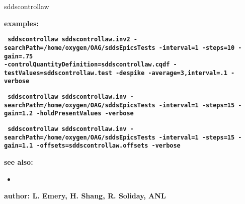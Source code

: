 \begin{sddsprog}{sddscontrollaw}
\item {\bf examples:}
     \begin{flushleft}{\tt \bf
        sddscontrollaw sddscontrollaw.inv2 -searchPath=/home/oxygen/OAG/sddsEpicsTests -interval=1 -steps=10 -gain=.75 \\
         -controlQuantityDefinition=sddscontrollaw.cqdf -testValues=sddscontrollaw.test -despike -average=3,interval=.1 -verbose
     }\end{flushleft}

      \begin{flushleft}{\tt \bf
     sddscontrollaw sddscontrollaw.inv -searchPath=/home/oxygen/OAG/sddsEpicsTests  -interval=1 -steps=15 -gain=1.2 -holdPresentValues -verbose
      }\end{flushleft}

     \begin{flushleft}{\tt \bf
     sddscontrollaw sddscontrollaw.inv -searchPath=/home/oxygen/OAG/sddsEpicsTests  -interval=1 -steps=15 -gain=1.1 -offsets=sddscontrollaw.offsets -verbose
     }\end{flushleft}
        
\item {\bf see also:}
 
%    
    \begin{itemize}
    \item {}
    \end{itemize}
\item {\bf author: L. Emery, H. Shang, R. Soliday, ANL}
\end{sddsprog}
